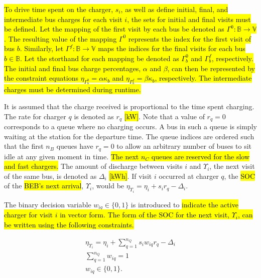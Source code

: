 \documentclass[utf8]{FrontiersinHarvard}
\begin{document}
\hl{To drive time spent on the charger, $s_i$, as well as define initial, final, and intermediate bus charges for each
  visit $i$, the sets for initial and final visits must be defined. Let the mapping of the first visit by each bus be
  denoted as $\Gamma^0 : \mathbb{B} \rightarrow \mathbb{V}$. The resulting value of the mapping $\Gamma^0$ represents
  the index for the first visit of bus $b$. Similarly, let $\Gamma^f : \mathbb{B} \rightarrow \mathbb{V}$ maps the
  indices for the final visits for each bus $b \in \mathbb{B}$. Let the storthand for each mapping be denoted as
  $\Gamma^0_b$ and $\Gamma^f_b$, respectively. The initial and final bus charge percentages, $\alpha$ and $\beta$, can
  then be represented by the constraint equations $\eta_{\Gamma^0_b} = \alpha \kappa_{b}$ and $\eta_{\Gamma^f_b} = \beta
  \kappa_{b}$, respectively. The intermediate charges must be determined during runtime.}

It is assumed that the charge received is proportional to the time spent charging. The rate for charger \(q\) is denoted
as \(r_q\) \hl{[kW]}. Note that a value of \(r_q = 0\) corresponds to a queue where no charging occurs. A bus in
such a queue is simply waiting at the station for the departure time. The queue indices are ordered such that the first
\(n_B\) queues have \(r_q = 0\) to allow an arbitrary number of buses to sit idle at any given moment in time.
\hl{The next $n_C$ queues are reserved for the slow and fast chargers.} The amount of discharge between
visits \(i\) and \(\Upsilon_i\), the next visit of the same bus, is denoted as \(\Delta_i\) \hl{[kWh]}. If visit \(i\) occurred
at charger \(q\), the \hl{SOC} of the \hl{BEB's next arrival}, \(\Upsilon_i\), would be \(\eta_{\Upsilon_i} = \eta_i + s_i
r_q - \Delta_i\).

The binary decision variable \(w_{iq} \in \{0,1\}\) is introduced to \hl{indicate the active charger for visit $i$ in vector form. The form of the SOC for the next visit, $\Upsilon_i$, can be written using the following constraints.}

\begin{subequations}
    \label{subeq:pre_next_charge}
\begin{align}
    \eta_{\Upsilon_i} = \eta_i + \sum_{q=1}^{n_Q} s_i w_{iq} r_q - \Delta_i \\
    \sum_{q=1}^{n_Q} w_{iq} = 1                           \\
    w_{iq} \in \{0,1\}.
\end{align}
\end{subequations}
\end{document}
